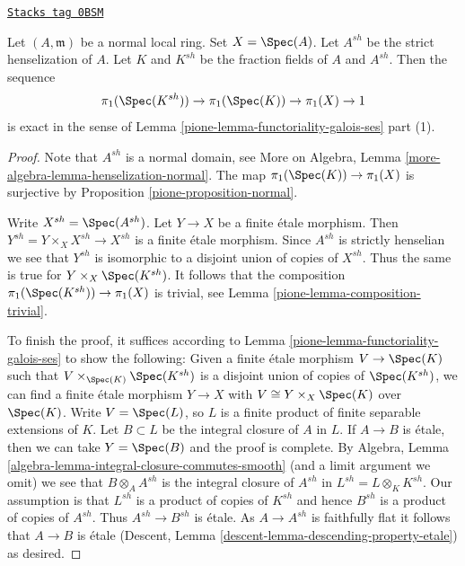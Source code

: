 \begin{lemma}
\label{pione-lemma-local-exact-sequence-normal}
\href{https://stacks.math.columbia.edu/tag/0BSM}{\texttt{Stacks tag 0BSM}}

Let $(A, \mathfrak m)$ be a normal local ring.
Set $X = \Spec(A)$. Let $A^{sh}$ be the strict henselization of $A$.
Let $K$ and $K^{sh}$ be the fraction fields of $A$ and $A^{sh}$.
Then the sequence
$$
\pi_1(\Spec(K^{sh})) \to \pi_1(\Spec(K)) \to \pi_1(X) \to 1
$$
is exact in the sense of Lemma \ref{pione-lemma-functoriality-galois-ses} part (1).
\end{lemma}

\begin{proof}

Note that $A^{sh}$ is a normal domain, see
More on Algebra, Lemma \ref{more-algebra-lemma-henselization-normal}.
The map $\pi_1(\Spec(K)) \to \pi_1(X)$ is surjective by
Proposition \ref{pione-proposition-normal}.

\medskip\noindent
Write $X^{sh} = \Spec(A^{sh})$. Let $Y \to X$ be a finite \'etale morphism.
Then $Y^{sh} = Y \times_X X^{sh} \to X^{sh}$ is a finite \'etale morphism.
Since $A^{sh}$ is strictly henselian we see that $Y^{sh}$ is isomorphic
to a disjoint union of copies of $X^{sh}$. Thus the same is true for
$Y \times_X \Spec(K^{sh})$. It follows that the composition
$\pi_1(\Spec(K^{sh})) \to \pi_1(X)$ is trivial, see
Lemma \ref{pione-lemma-composition-trivial}.

\medskip\noindent
To finish the proof, it suffices according to
Lemma \ref{pione-lemma-functoriality-galois-ses}
to show the following: Given a finite \'etale morphism
$V \to \Spec(K)$ such that $V \times_{\Spec(K)} \Spec(K^{sh})$
is a disjoint union of copies of $\Spec(K^{sh})$, we can find a
finite \'etale morphism
$Y \to X$ with $V \cong Y \times_X \Spec(K)$ over $\Spec(K)$.
Write $V = \Spec(L)$, so $L$ is a finite product of
finite separable extensions of $K$.
Let $B \subset L$ be the integral closure of $A$ in $L$.
If $A \to B$ is \'etale, then we can take $Y = \Spec(B)$
and the proof is complete. By
Algebra, Lemma \ref{algebra-lemma-integral-closure-commutes-smooth}
(and a limit argument we omit)
we see that $B \otimes_A A^{sh}$ is the integral closure of
$A^{sh}$ in $L^{sh} = L \otimes_K K^{sh}$.
Our assumption is that $L^{sh}$ is a product of copies of
$K^{sh}$ and hence $B^{sh}$ is a product of copies of $A^{sh}$.
Thus $A^{sh} \to B^{sh}$ is \'etale. As $A \to A^{sh}$ is
faithfully flat it follows that $A \to B$ is \'etale
(Descent, Lemma \ref{descent-lemma-descending-property-etale})
as desired.
\end{proof}

